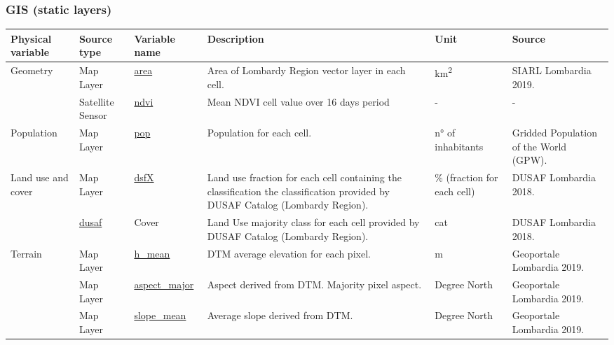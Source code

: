 \subsubsection{GIS (static layers)}

\begin{center}
\setlength{\arrayrulewidth}{1.5pt}
\begin{longtable}{ |p{2cm}|p{1.5cm}|p{2.3cm}|p{4cm}|p{1.2cm}|p{2cm}| } 
\hline
\textbf{Physical variable} & \textbf{Source type}  & \textbf{Variable name}  & \textbf{Description}  & \textbf{Unit}  & \textbf{Source}\\ 
\hline
\multirow{1}{4em}{Geometry} & Map Layer  & \underline{area} & Area of Lombardy Region vector layer in each cell. & km\textsuperscript{2} & SIARL Lombardia 2019.\\ 
& Satellite \newline Sensor  & \underline{ndvi} &  Mean NDVI cell value over 16 days period & - & - \\ \hline

\multirow{1}{4em}{Population} & Map Layer  & \underline{pop} & Population for each cell. & n° of inhabitants& Gridded Population of the World (GPW).\\ \hline

\multirow{2}{4em}{Land use and cover} & Map Layer  & \underline{dsfX} & Land use fraction for each cell containing the classification the classification provided by DUSAF Catalog (Lombardy Region). & \% (fraction for each cell) & DUSAF Lombardia 2018.\\ 
Map Layer  & \underline{dusaf} & Cover & Land Use majority class for each cell provided by DUSAF Catalog (Lombardy Region). & cat  & DUSAF Lombardia 2018.\\
\hline

\multirow{3}{4em}{Terrain} & Map Layer  & \underline{h\_mean} & DTM average elevation for each pixel. & m & Geoportale Lombardia 2019.\\ 
& Map Layer  & \underline{aspect\_major} & Aspect derived from DTM. Majority pixel aspect. & Degree North & Geoportale Lombardia 2019.\\ 
& Map Layer  & \underline{slope\_mean} & Average slope derived from DTM. & Degree North & Geoportale Lombardia 2019.\\ 

\hline


\end{longtable}
\end{center}
